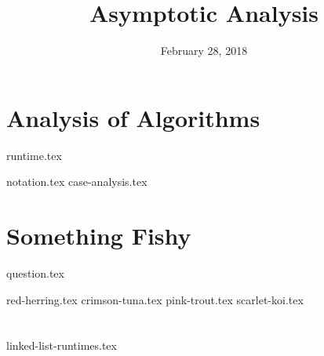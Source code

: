 \documentclass[11pt]{exam}
\title{Asymptotic Analysis}
\date{February 28, 2018}
\begin{document}
\maketitle

\section{Analysis of Algorithms}
{runtime.tex}
\begin{questions}
{notation.tex}
{case-analysis.tex}
\end{questions}

\clearpage

\section{Something Fishy}
{question.tex}
\begin{questions}
{red-herring.tex}
{crimson-tuna.tex}
{pink-trout.tex}
{scarlet-koi.tex}
\end{questions}

\clearpage

\section{}
\begin{questions}
{linked-list-runtimes.tex}
\end{questions}
\end{document}
